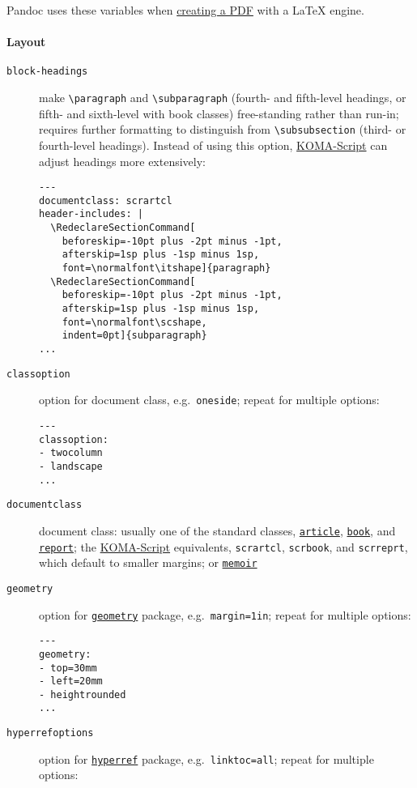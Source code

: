 \documentclass[
]{article}
\begin{document}
Pandoc uses these variables when \hyperref[creating-a-pdf]{creating a
PDF} with a LaTeX engine.

\paragraph{Layout}\label{layout}

\begin{description}
\item[\texttt{block-headings}]
make \texttt{\textbackslash{}paragraph} and
\texttt{\textbackslash{}subparagraph} (fourth- and fifth-level headings,
or fifth- and sixth-level with book classes) free-standing rather than
run-in; requires further formatting to distinguish from
\texttt{\textbackslash{}subsubsection} (third- or fourth-level
headings). Instead of using this option,
\href{https://ctan.org/pkg/koma-script}{KOMA-Script} can adjust headings
more extensively:

\begin{verbatim}
---
documentclass: scrartcl
header-includes: |
  \RedeclareSectionCommand[
    beforeskip=-10pt plus -2pt minus -1pt,
    afterskip=1sp plus -1sp minus 1sp,
    font=\normalfont\itshape]{paragraph}
  \RedeclareSectionCommand[
    beforeskip=-10pt plus -2pt minus -1pt,
    afterskip=1sp plus -1sp minus 1sp,
    font=\normalfont\scshape,
    indent=0pt]{subparagraph}
...
\end{verbatim}
\item[\texttt{classoption}]
option for document class, e.g.~\texttt{oneside}; repeat for multiple
options:

\begin{verbatim}
---
classoption:
- twocolumn
- landscape
...
\end{verbatim}
\item[\texttt{documentclass}]
document class: usually one of the standard classes,
\href{https://ctan.org/pkg/article}{\texttt{article}},
\href{https://ctan.org/pkg/book}{\texttt{book}}, and
\href{https://ctan.org/pkg/report}{\texttt{report}}; the
\href{https://ctan.org/pkg/koma-script}{KOMA-Script} equivalents,
\texttt{scrartcl}, \texttt{scrbook}, and \texttt{scrreprt}, which
default to smaller margins; or
\href{https://ctan.org/pkg/memoir}{\texttt{memoir}}
\item[\texttt{geometry}]
option for \href{https://ctan.org/pkg/geometry}{\texttt{geometry}}
package, e.g.~\texttt{margin=1in}; repeat for multiple options:

\begin{verbatim}
---
geometry:
- top=30mm
- left=20mm
- heightrounded
...
\end{verbatim}
\item[\texttt{hyperrefoptions}]
option for \href{https://ctan.org/pkg/hyperref}{\texttt{hyperref}}
package, e.g.~\texttt{linktoc=all}; repeat for multiple options:


\end{description}
\end{document}
